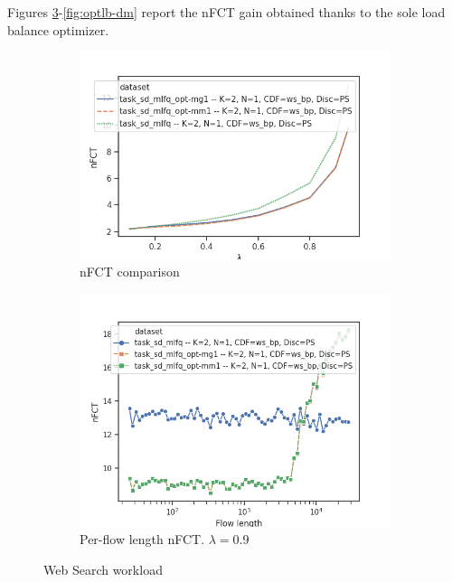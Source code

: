 Figures \ref{fig:optlb-ws}-\ref{fig:optlb-dm} report the nFCT gain obtained thanks to the sole load balance optimizer. 
\begin{figure}
	\centering
	\begin{subfigure}{.5\textwidth}
		\centering
		\includegraphics[width=1.05\textwidth]{Chapter3/Figures/ws_ps_comparison}
		\caption{nFCT comparison}
		\label{fig:optlbgain-ws}
	\end{subfigure}%
	\begin{subfigure}{.5\textwidth}
		\centering
		\includegraphics[width=\textwidth]{Chapter3/Figures/ws_ps_detailed.png}
		\caption{Per-flow length nFCT. $\lambda=$0.9}
		\label{fig:optlbgainvsflowsize-ws}
	\end{subfigure}%
	\caption{Web Search workload}
	\label{fig:optlb-ws}
\end{figure}%
